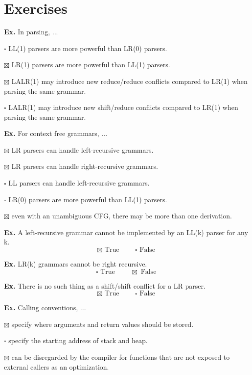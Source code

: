 \section*{Exercises}

\hrulefill

\textbf{Ex.} In parsing, ...
\begin{compactitem}[$\quad\bullet$]
	\item[$\square$] LL(1) parsers are more powerful than LR(0) parsers.
	\item[$\boxtimes$] LR(1) parsers are more powerful than LL(1) parsers.
	\item[$\boxtimes$] LALR(1) may introduce new reduce/reduce conflicts compared to LR(1) when parsing the same grammar.
	\item[$\square$] LALR(1) may introduce new shift/reduce conflicts compared to LR(1) when parsing the same grammar.
\end{compactitem}

\hrulefill

\textbf{Ex.} For context free grammars, ...
\begin{compactitem}[$\quad\bullet$]
	\item[$\boxtimes$] LR parsers can handle left-recursive grammars.
	\item[$\boxtimes$] LR parsers can handle right-recursive grammars.
	\item[$\square$] LL parsers can handle left-recursive grammars.
	\item[$\square$] LR(0) parsers are more powerful than LL(1) parsers.
	\item[$\boxtimes$] even with an unambiguous CFG, there may be more than one derivation.
\end{compactitem}

\hrulefill

\textbf{Ex.} A left-recursive grammar cannot be implemented by an LL(k) parser for any k.
$$ \boxtimes \text{ True } \qquad \square \text{ False }$$

\hrulefill

\textbf{Ex.} LR(k) grammars cannot be right recursive.
$$ \square \text{ True } \qquad \boxtimes \text{ False }$$


\hrulefill

\textbf{Ex.} There is no such thing as a shift/shift conflict for a LR parser.
$$ \boxtimes \text{ True } \qquad \square \text{ False }$$


\hrulefill

\textbf{Ex.} Calling conventions, ...
\begin{compactitem}[$\quad\bullet$]
	\item[$\boxtimes$] specify where arguments and return values should be stored.
	\item[$\square$] specify the starting address of stack and heap.
	\item[$\boxtimes$] can be disregarded by the compiler for functions that are not exposed to external callers as an optimization.
\end{compactitem}

